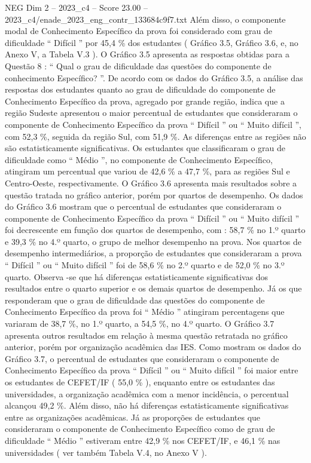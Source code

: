 \begin{textsample}{NEG Dim 2 – 2023\_c4 – Score 23.00 – 2023\_c4/enade\_2023\_eng\_contr\_133684c9f7.txt}
Além disso, o componente modal de Conhecimento Específico da prova foi considerado com grau de dificuldade “ Difícil ” por 45,4 \% dos estudantes ( Gráfico 3.5, Gráfico 3.6, e, no Anexo V, a Tabela V.3 ).
O Gráfico 3.5 apresenta as respostas obtidas para a Questão 8 : “ Qual o grau de dificuldade das questões do componente de conhecimento Específico? ”.
De acordo com os dados do Gráfico 3.5, a análise das respostas dos estudantes quanto ao grau de dificuldade do componente de Conhecimento Específico da prova, agregado por grande região, indica que a região Sudeste apresentou o maior percentual de estudantes que consideraram o componente de Conhecimento Específico da prova “ Difícil ” ou “ Muito difícil ”, com 52,3 \%, seguida da região Sul, com 51,9 \%.
As diferenças entre as regiões não são estatisticamente significativas.
Os estudantes que classificaram o grau de dificuldade como “ Médio ”, no componente de Conhecimento Específico, atingiram um percentual que variou de 42,6 \% a 47,7 \%, para as regiões Sul e Centro-Oeste, respectivamente.
O Gráfico 3.6 apresenta mais resultados sobre a questão tratada no gráfico anterior, porém por quartos de desempenho.
Os dados do Gráfico 3.6 mostram que o percentual de estudantes que consideraram o componente de Conhecimento Específico da prova “ Difícil ” ou “ Muito difícil ” foi decrescente em função dos quartos de desempenho, com : 58,7 \% no 1.º quarto e 39,3 \% no 4.º quarto, o grupo de melhor desempenho na prova.
Nos quartos de desempenho intermediários, a proporção de estudantes que consideraram a prova “ Difícil ” ou “ Muito difícil ” foi de 58,6 \% no 2.º quarto e de 52,0 \% no 3.º quarto.
Observa -se que há diferenças estatisticamente significativas dos resultados entre o quarto superior e os demais quartos de desempenho.
Já os que responderam que o grau de dificuldade das questões do componente de Conhecimento Específico da prova foi “ Médio ” atingiram percentagens que variaram de 38,7 \%, no 1.º quarto, a 54,5 \%, no 4.º quarto.
O Gráfico 3.7 apresenta outros resultados em relação à mesma questão retratada no gráfico anterior, porém por organização acadêmica das IES.
Como mostram os dados do Gráfico 3.7, o percentual de estudantes que consideraram o componente de Conhecimento Específico da prova “ Difícil ” ou “ Muito difícil ” foi maior entre os estudantes de CEFET/IF ( 55,0 \% ), enquanto entre os estudantes das universidades, a organização acadêmica com a menor incidência, o percentual alcançou 49,2 \%.
Além disso, não há diferenças estatisticamente significativas entre as organizações acadêmicas.
Já as proporções de estudantes que consideraram o componente de Conhecimento Específico como de grau de dificuldade “ Médio ” estiveram entre 42,9 \% nos CEFET/IF, e 46,1 \% nas universidades ( ver também Tabela V.4, no Anexo V ).

\end{textsample}
